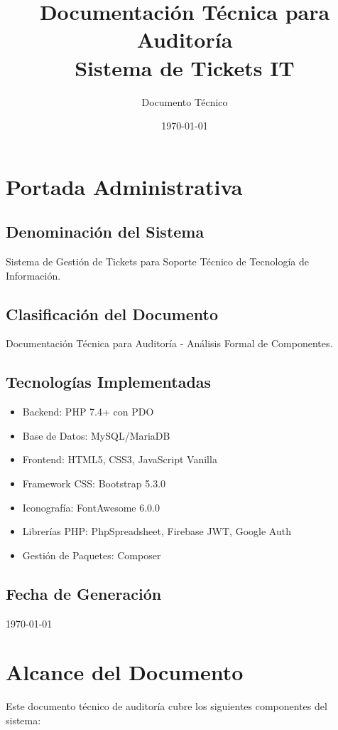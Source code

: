 \documentclass[12pt,a4paper]{article}
\title{\textbf{Documentación Técnica para Auditoría}\\
\vspace{0.5cm}
\large{Sistema de Tickets IT}}
\author{Documento Técnico}
\date{\today}
\begin{document}
\maketitle

\newpage

\section{Portada Administrativa}

\subsection{Denominación del Sistema}
Sistema de Gestión de Tickets para Soporte Técnico de Tecnología de Información.

\subsection{Clasificación del Documento}
Documentación Técnica para Auditoría - Análisis Formal de Componentes.

\subsection{Tecnologías Implementadas}
\begin{itemize}
    \item Backend: PHP 7.4+ con PDO
    \item Base de Datos: MySQL/MariaDB
    \item Frontend: HTML5, CSS3, JavaScript Vanilla
    \item Framework CSS: Bootstrap 5.3.0
    \item Iconografía: FontAwesome 6.0.0
    \item Librerías PHP: PhpSpreadsheet, Firebase JWT, Google Auth
    \item Gestión de Paquetes: Composer
\end{itemize}

\subsection{Fecha de Generación}
\today

\newpage

\section{Alcance del Documento}

Este documento técnico de auditoría cubre los siguientes componentes del sistema:
\end{document}
